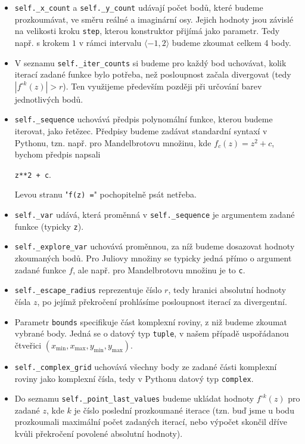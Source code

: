 \begin{itemize}
    \item \texttt{self.\_x\_count} a \texttt{self.\_y\_count} udávají počet bodů, které budeme prozkoumávat, ve směru reálné a imaginární osy. Jejich hodnoty jsou závislé na velikosti kroku \texttt{step}, kterou konstruktor přijímá jako parametr. Tedy např. s krokem $1$ v rámci intervalu $\langle-1,2\rangle$ budeme zkoumat celkem 4 body.
    \item V seznamu \texttt{self.\_iter\_counts} si budeme pro každý bod uchovávat, kolik iterací zadané funkce bylo potřeba, než posloupnost začala divergovat (tedy $|f^{\circ k}(z)|>r$). Ten využijeme především později při určování barev jednotlivých bodů.
    \item \texttt{self.\_sequence} uchovává předpis polynomální funkce, kterou budeme iterovat, jako řetězec. Předpisy budeme zadávat standardní syntaxí v Pythonu, tzn. např. pro Mandelbrotovu množinu, kde $f_c(z)=z^2+c$, bychom předpis napsali
    \begin{center}
        \texttt{z**2 + c}.
    \end{center}
    Levou stranu "\texttt{f(z) =}" pochopitelně psát netřeba.
    \item \texttt{self.\_var} udává, která proměnná v \texttt{self.\_sequence} je argumentem zadané funkce (typicky \texttt{z}).
    \item \texttt{self.\_explore\_var} uchovává proměnnou, za níž budeme dosazovat hodnoty zkoumaných bodů. Pro Juliovy množiny se typicky jedná přímo o argument zadané funkce $f$, ale např. pro Mandelbrotovu množinu je to \texttt{c}.
    \item \texttt{self.\_escape\_radius} reprezentuje číslo $r$, tedy hranici absolutní hodnoty čísla $z$, po jejímž překročení prohlásíme posloupnost iterací za divergentní.
    \item Parametr \texttt{bounds} specifikuje část komplexní roviny, z niž budeme zkoumat vybrané body. Jedná se o datový typ \texttt{tuple}, v našem případě uspořádanou čtveřici $(x_{\text{min}},x_{\text{max}},y_{\text{min}},y_{\text{max}})$.
    \item \texttt{self.\_complex\_grid} uchovává všechny body ze zadané části komplexní roviny jako komplexní čísla, tedy v Pythonu datový typ \texttt{complex}.
    \item Do seznamu \texttt{self.\_point\_last\_values} budeme ukládat hodnoty $f^{\circ k}(z)$ pro zadané $z$, kde $k$ je číslo poslední prozkoumané iterace (tzn. buď jsme u bodu prozkoumali maximální počet zadaných iterací, nebo výpočet skončil dříve kvůli překročení povolené absolutní hodnoty).
\end{itemize}
